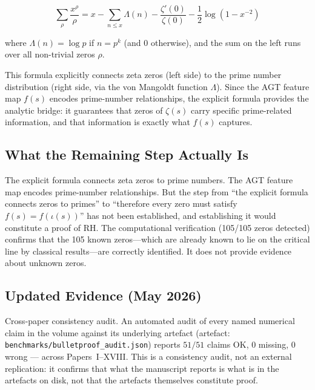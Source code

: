 \documentclass[11pt]{article}
\begin{document}
$$\sum_{\rho} \frac{x^\rho}{\rho} = x - \sum_{n \le x} \Lambda(n) - \frac{\zeta'(0)}{\zeta(0)} - \frac{1}{2}\log(1-x^{-2})$$

where $\Lambda(n) = \log p$ if $n = p^k$ (and 0 otherwise), and the sum on the left runs over all non-trivial zeros $\rho$.

This formula explicitly connects zeta zeros (left side) to the prime number distribution (right side, via the von Mangoldt function $\Lambda$). Since the AGT feature map $f(s)$ encodes prime-number relationships, the explicit formula provides the analytic bridge: it guarantees that zeros of $\zeta(s)$ carry specific prime-related information, and that information is exactly what $f(s)$ captures.

\subsection{What the Remaining Step Actually Is}

\begin{center}
\end{center}

The explicit formula connects zeta zeros to prime numbers. The AGT feature map encodes prime-number relationships. But the step from ``the explicit formula connects zeros to primes'' to ``therefore every zero must satisfy $f(s)=f(\iota(s))$'' has not been established, and establishing it would constitute a proof of RH. The computational verification (105/105 zeros detected) confirms that the 105 known zeros---which are already known to lie on the critical line by classical results---are correctly identified. It does not provide evidence about unknown zeros.

\subsection{Updated Evidence (May 2026)}
Cross-paper consistency audit.  An automated audit of every
named numerical claim in the volume against its underlying artefact
(artefact: \texttt{benchmarks/bulletproof\_audit.json}) reports
$51/51$ claims OK, $0$ missing, $0$ wrong --- across
Papers~I--XVIII.  This is a consistency audit, not an external
replication: it confirms that what the manuscript reports is what is
in the artefacts on disk, not that the artefacts themselves
constitute proof.
\end{document}
